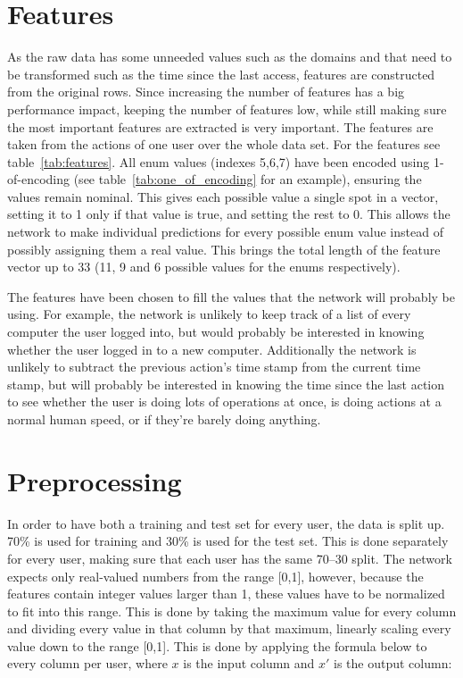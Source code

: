 \section{Features}
As the raw data has some unneeded values such as the domains and that need to be transformed such as the time since the last access, features are constructed from the original rows. Since increasing the number of features has a big performance impact, keeping the number of features low, while still making sure the most important features are extracted is very important. The features are taken from the actions of one user over the whole data set. For the features see table~\ref{tab:features}. All enum values (indexes 5,6,7) have been encoded using 1-of-encoding (see table~\ref{tab:one_of_encoding} for an example), ensuring the values remain nominal. This gives each possible value a single spot in a vector, setting it to 1 only if that value is true, and setting the rest to 0. This allows the network to make individual predictions for every possible enum value instead of possibly assigning them a real value. This brings the total length of the feature vector up to 33 (11, 9 and 6 possible values for the enums respectively).

The features have been chosen to fill the values that the network will probably be using. For example, the network is unlikely to keep track of a list of every computer the user logged into, but would probably be interested in knowing whether the user logged in to a new computer. Additionally the network is unlikely to subtract the previous action's time stamp from the current time stamp, but will probably be interested in knowing the time since the last action to see whether the user is doing lots of operations at once, is doing actions at a normal human speed, or if they're barely doing anything.

\section{Preprocessing}
In order to have both a training and test set for every user, the data is split up. 70\% is used for training and 30\% is used for the test set. This is done separately for every user, making sure that each user has the same 70--30 split. The network expects only real-valued numbers from the range [0,1], however, because the features contain integer values larger than 1, these values have to be normalized to fit into this range. This is done by taking the maximum value for every column and dividing every value in that column by that maximum, linearly scaling every value down to the range [0,1]. This is done by applying the formula below to every column per user, where \(x\) is the input column and \(x'\) is the output column:


